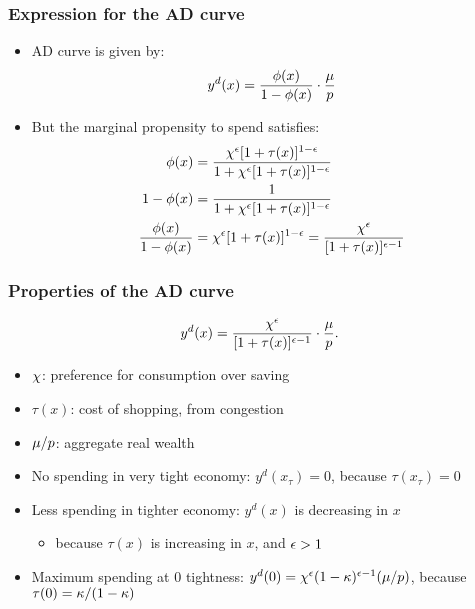 \documentclass[11pt,aspectratio=169,xcolor={dvipsnames},hyperref={pdftex,pdfpagemode=UseNone,hidelinks,pdfdisplaydoctitle=true},usepdftitle=false]{beamer}
\begin{document}
\begin{frame}
\frametitle{Expression for the AD curve}
\begin{itemize}
\item AD curve is given by:
\begin{equation*}
y^d(x) = \frac{\phi(x)}{1-\phi(x)}\cdot \frac{\mu}{p}
\end{equation*}
\item But the marginal propensity to spend satisfies:
\begin{align*}
\phi(x) &=  \frac{\chi^{\epsilon} [1+\tau(x)]^{1 - \epsilon}}{1 + \chi^{\epsilon}[1+\tau(x)]^{1 - \epsilon}}\\
1-\phi(x) &=  \frac{1}{1 + \chi^{\epsilon}[1+\tau(x)]^{1 - \epsilon}}\\
\frac{\phi(x)}{1-\phi(x)} & = \chi^{\epsilon} [1+\tau(x)]^{1 - \epsilon} = \frac{ \chi^{\epsilon}}{[1+\tau(x)]^{\epsilon-1}}
\end{align*}
\end{itemize}	
\end{frame}

\begin{frame}
\frametitle{Properties of the AD curve}
\vspace*{-5mm}\begin{equation*}
y^d(x) = \frac{\chi^{\epsilon}}{[1+\tau(x)]^{\epsilon-1}}\cdot \frac{\mu}{p}.
\end{equation*}\vspace*{-5mm}
\begin{itemize}
\item $\chi$: preference for consumption over saving
\item $\tau(x)$: cost of shopping, from congestion
\item $\mu/p$: aggregate real wealth
\item No spending in very tight economy: $y^d(x_{\tau}) = 0$, because $\tau(x_{\tau}) =0$
\item Less spending in tighter economy: $y^d(x)$ is decreasing in $x$
\begin{itemize}
\item because $\tau(x)$ is increasing in $x$, and $\epsilon>1$
\end{itemize}
\item Maximum spending at $0$ tightness: $y^d(0) = \chi^{\epsilon} (1-\kappa)^{\epsilon-1}(\mu/p)$, because $\tau(0)=\kappa/(1-\kappa)$
\end{itemize}	
\end{frame}
\end{document}
